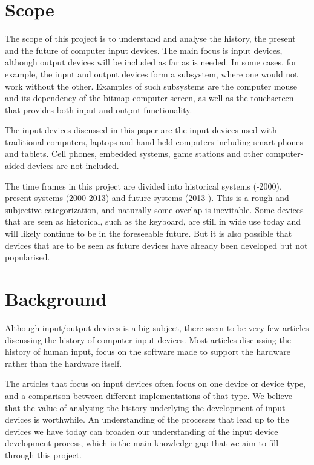 \documentclass[a4paper,10pt]{article}
\begin{document}
\section{Scope}

The scope of this project is to understand and analyse the history, the present and the future of computer input devices. The main focus is input devices, although output devices will be included as far as is needed. In some cases, for example, the input and output devices form a subsystem, where one would not work without the other. Examples of such subsystems are the computer mouse and its dependency of the bitmap computer screen, as well as the touchscreen that provides both input and output functionality. 

The input devices discussed in this paper are the input devices used with traditional computers, laptops and hand-held computers including smart phones and tablets. Cell phones, embedded systems, game stations and other computer-aided devices are not included.

The time frames in this project are divided into historical systems (-2000), present systems (2000-2013) and future systems (2013-). This is a rough and subjective categorization, and naturally some overlap is inevitable. Some devices that are seen as historical, such as the keyboard, are still in wide use today and will likely continue to be in the foreseeable future. But it is also possible that devices that are to be seen as future devices have already been developed but not popularised.

\section{Background}
Although input/output devices is a big subject, there seem to be very few articles discussing the history of computer input devices. Most articles discussing the history of human input, focus on the software made to support the hardware rather than the hardware itself.

The articles that focus on input devices often focus on one device or device type, and a comparison between different implementations of that type. We believe that the value of analysing the history underlying the development of input devices is worthwhile. An understanding of the processes that lead up to the devices we have today can broaden our understanding of the input device development process, which is the main knowledge gap that we aim to fill through this project.
\end{document}
